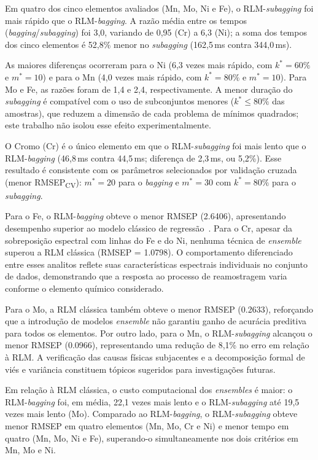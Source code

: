 Em quatro dos cinco elementos avaliados (Mn, Mo, Ni e Fe), o
RLM-\textit{subagging} foi mais rápido que o RLM-\textit{bagging}. A razão
média entre os tempos (\textit{bagging}/\textit{subagging}) foi 3,0, variando
de 0,95 (Cr) a 6,3 (Ni); a soma dos tempos dos cinco elementos é 52,8\% menor
no \textit{subagging} (162,5\,ms contra 344,0\,ms).

As maiores diferenças ocorreram para o Ni (6,3 vezes mais rápido, com
$k^*=60\%$ e $m^*=10$) e para o Mn (4,0 vezes mais rápido, com $k^*=80\%$ e
$m^*=10$). Para Mo e Fe, as razões foram de 1,4 e 2,4, respectivamente. A menor
duração do \textit{subagging} é compatível com o uso de subconjuntos menores
($k^* \leq 80\%$ das amostras), que reduzem a dimensão de cada problema de
mínimos quadrados; este trabalho não isolou esse efeito experimentalmente.

O Cromo (Cr) é o único elemento em que o RLM-\textit{subagging} foi mais lento
que o RLM-\textit{bagging} (46,8\,ms contra 44,5\,ms; diferença de 2,3\,ms, ou
5,2\%). Esse resultado é consistente com os parâmetros selecionados por
validação cruzada (menor RMSEP\textsubscript{CV}): $m^*=20$ para o \textit{bagging} e
$m^*=30$ com $k^*=80\%$ para o \textit{subagging}.

Para o Fe, o RLM-\textit{bagging} obteve o menor RMSEP (\num{2,6406}), apresentando desempenho superior ao modelo clássico de regressão~\cite{TAKAHASHI201731}. Para o Cr, apesar da sobreposição espectral com linhas do Fe e do Ni, nenhuma técnica de \textit{ensemble} superou a RLM clássica (RMSEP = \num{1,0798}). O comportamento diferenciado entre esses analitos reflete suas características espectrais individuais no conjunto de dados, demonstrando que a resposta ao processo de reamostragem varia conforme o elemento químico considerado.

Para o Mo, a RLM clássica também obteve o menor RMSEP (\num{0,2633}), reforçando que a introdução de modelos \textit{ensemble} não garantiu ganho de acurácia preditiva para todos os elementos. Por outro lado, para o Mn, o RLM-\textit{subagging} alcançou o menor RMSEP (\num{0,0966}), representando uma redução de 8,1\% no erro em relação à RLM. A verificação das causas físicas subjacentes e a decomposição formal de viés e variância constituem tópicos sugeridos para investigações futuras.

Em relação à RLM clássica, o custo computacional dos \textit{ensembles} é
maior: o RLM-\textit{bagging} foi, em média, 22,1 vezes mais lento e o
RLM-\textit{subagging} até 19,5 vezes mais lento (Mo). Comparado ao
RLM-\textit{bagging}, o RLM-\textit{subagging} obteve menor RMSEP em quatro
elementos (Mn, Mo, Cr e Ni) e menor tempo em quatro (Mn, Mo, Ni e Fe),
superando-o simultaneamente nos dois critérios em Mn, Mo e Ni.


